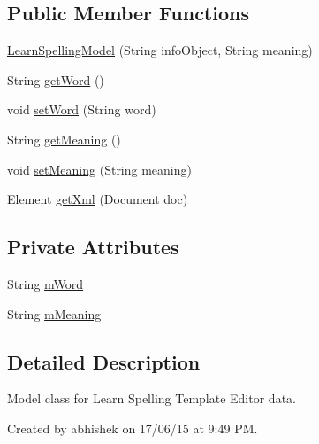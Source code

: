 \subsection*{Public Member Functions}
\begin{DoxyCompactItemize}
\item 
\hyperlink{classorg_1_1buildmlearn_1_1toolkit_1_1templates_1_1LearnSpellingModel_a3a4f0e6afa5518b6eee58e848921158c}{Learn\+Spelling\+Model} (String info\+Object, String meaning)
\item 
String \hyperlink{classorg_1_1buildmlearn_1_1toolkit_1_1templates_1_1LearnSpellingModel_a076fc8889dd81620c579511cf84cd526}{get\+Word} ()
\item 
void \hyperlink{classorg_1_1buildmlearn_1_1toolkit_1_1templates_1_1LearnSpellingModel_a19e23525a8849fc802aa12ab90f511a2}{set\+Word} (String word)
\item 
String \hyperlink{classorg_1_1buildmlearn_1_1toolkit_1_1templates_1_1LearnSpellingModel_a74785e99070999af859d2211d465d0a2}{get\+Meaning} ()
\item 
void \hyperlink{classorg_1_1buildmlearn_1_1toolkit_1_1templates_1_1LearnSpellingModel_a8e34f3d996440542557e0352429906f2}{set\+Meaning} (String meaning)
\item 
Element \hyperlink{classorg_1_1buildmlearn_1_1toolkit_1_1templates_1_1LearnSpellingModel_a17c942dd683427e078dae596fbf9972a}{get\+Xml} (Document doc)
\end{DoxyCompactItemize}
\subsection*{Private Attributes}
\begin{DoxyCompactItemize}
\item 
String \hyperlink{classorg_1_1buildmlearn_1_1toolkit_1_1templates_1_1LearnSpellingModel_af75eba5d0d60e62fa1f860bb1d8c4933}{m\+Word}
\item 
String \hyperlink{classorg_1_1buildmlearn_1_1toolkit_1_1templates_1_1LearnSpellingModel_a20b033bd4498a18e924aef45154b9e25}{m\+Meaning}
\end{DoxyCompactItemize}


\subsection{Detailed Description}
Model class for Learn Spelling Template Editor data. 

Created by abhishek on 17/06/15 at 9\+:49 PM. 

